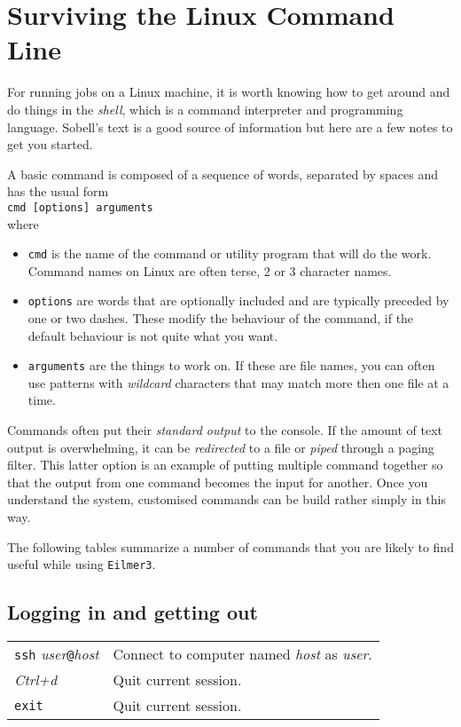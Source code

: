\section{Surviving the Linux Command Line}
\label{linux-command-notes-sec}
For running jobs on a Linux machine, it is worth knowing how to get around and do things in the \textit{shell},
which is a command interpreter and programming language.
Sobell's text \cite{sobell_2005a} is a good source of information but here are a few notes to get you started.

\medskip
A basic command is composed of a sequence of words, separated by spaces and has the usual form\\
\texttt{cmd [options] arguments}\\
where 
\begin{itemize}
 \item\texttt{cmd} is the name of the command or utility program that will do the work.
   Command names on Linux are often terse, 2 or 3 character names.
 \item\texttt{options} are words that are optionally included and are typically preceded by one or two dashes.
   These modify the behaviour of the command, if the default behaviour is not quite what you want.
 \item \texttt{arguments} are the things to work on.
   If these are file names, you can often use patterns with \textit{wildcard} characters that may match
   more then one file at a time.
\end{itemize}
Commands often put their \textit{standard output} to the console.
If the amount of text output is overwhelming, it can be \textit{redirected} to a file 
or \textit{piped} through a paging filter.
This latter option is an example of putting multiple command together so that the output from
one command becomes the input for another.
Once you understand the system, customised commands can be build rather simply in this way.

The following tables summarize a number of commands that you are likely to find useful while
using \texttt{Eilmer3}.\\

\subsection*{Logging in and getting out}
\begin{tabular}{l|l}
 \texttt{ssh} \textit{user}\texttt{@}\textit{host} & Connect to computer named \textit{host} as \textit{user}. \\
 \textit{Ctrl+d} & Quit current session. \\
 \texttt{exit} & Quit current session. \\
\end{tabular}

